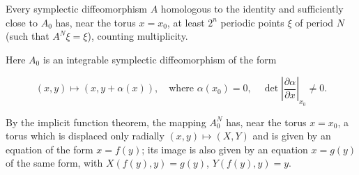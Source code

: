 Every symplectic diffeomorphism $A$ homologous to the identity and sufficiently close to $A_0$ has, near the torus $x = x_0$, at least $2^n$ periodic points $\xi$ of period $N$ (such that $A^N \xi = \xi$), counting multiplicity.

Here $A_0$ is an integrable symplectic diffeomorphism of the form

$$(x, y) \mapsto (x, y + \alpha(x)), \quad \text{where } \alpha(x_0) = 0, \quad \det\left|\frac{\partial \alpha}{\partial x}\right|_{x_0} \neq 0.$$

By the implicit function theorem, the mapping $A_0^N$ has, near the torus $x = x_0$, a torus which is displaced only radially $(x, y) \mapsto (X, Y)$ and is given by an equation of the form $x = f(y)$; its image is also given by an equation $x = g(y)$ of the same form, with $X(f(y), y) = g(y)$, $Y(f(y), y) = y$.
